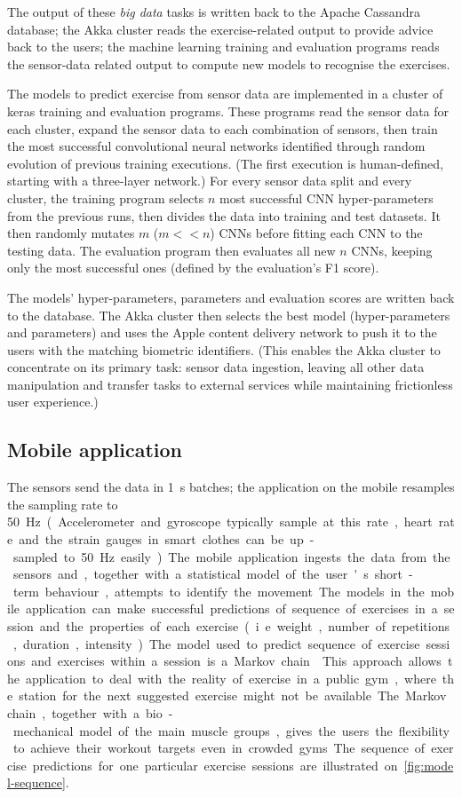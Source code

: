 \documentclass[a4paper, 10 pt, conference]{IEEEtran}
\begin{document}
The output of these \emph{big data} tasks is written back to the Apache Cassandra database; the Akka cluster reads the exercise-related output to provide advice back to the users; the machine learning training and evaluation programs reads the sensor-data related output to compute new models to recognise the exercises.

The models to predict exercise from sensor data are implemented in a cluster of keras \cite{keras} training and evaluation programs. These programs read the sensor data for each cluster, expand the sensor data to each combination of sensors, then train the most successful convolutional neural networks identified through random evolution of previous training executions. (The first execution is human-defined, starting with a three-layer network.) For every sensor data split and every cluster, the training program selects $n$ most successful CNN hyper-parameters from the previous runs, then divides the data into training and test datasets. It then randomly mutates $m$ ($m << n$) CNNs before fitting each CNN to the testing data. The evaluation program then evaluates all new $n$ CNNs, keeping only the most successful ones (defined by the evaluation's F1 score).

The models' hyper-parameters, parameters and evaluation scores are written back to the database. The Akka cluster then selects the best model (hyper-parameters and parameters) and uses the Apple content delivery network to push it to the users with the matching biometric identifiers. (This enables the Akka cluster to concentrate on its primary task: sensor data ingestion, leaving all other data manipulation and transfer tasks to external services while maintaining frictionless user experience.)

\subsection{Mobile application}

The sensors send the data in \SI{1}{\second} batches; the application on the mobile resamples the sampling rate to \SI{50}\hertz. (Accelerometer and gyroscope typically sample at this rate, heart rate and the strain gauges in smart clothes can be up-sampled to \SI{50}{\hertz} easily.) The mobile application ingests the data from the sensors and, together with a statistical model of the user's short-term behaviour, attempts to identify the movement. The models in the mobile application can make successful predictions of sequence of exercises in a session and the properties of each exercise (i.e. weight, number of repetitions, duration, intensity). The model used to predict sequence of exercise sessions and exercises within a session is a Markov chain \cite{markov-chain-exercise}. This approach allows the application to deal with the reality of exercise in a public gym, where the station for the next suggested exercise might not be available. The Markov chain, together with a bio-mechanical model of the main muscle groups, gives the users the flexibility to achieve their workout targets even in crowded gyms. The sequence of exercise predictions for one particular exercise sessions are illustrated on \autoref{fig:model-sequence}.
\end{document}
